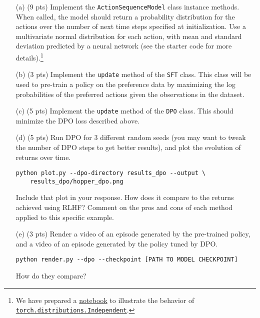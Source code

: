 \documentclass{article}
\begin{document}
\begin{enumerate}
    \item[(a) (9 pts)] Implement the \texttt{ActionSequenceModel} class instance methods. When called, the model should return a probability distribution for the actions over the number of next time steps specified at initialization. Use a multivariate normal distribution for each action, with mean and standard deviation predicted by a neural network (see the starter code for more details).\footnote{We have prepared a \href{https://colab.research.google.com/drive/1sw8FJIR5865laTJiI0fqHG3KcGVT23ED}{notebook} to illustrate the behavior of \href{https://pytorch.org/docs/stable/distributions.html\#independent}{\texttt{torch.distributions.Independent}}.}
    \item[(b) (3 pts)] Implement the \texttt{update} method of the \texttt{SFT} class. This class will be used to pre-train a policy on the preference data by maximizing the log probabilities of the preferred actions given the observations in the dataset.
    \item[(c) (5 pts)] Implement the \texttt{update} method of the \texttt{DPO} class. This should minimize the DPO loss described above.
    \item[(d) (5 pts)] Run DPO for 3 different random seeds (you may want to tweak the number of DPO steps to get better results), and plot the evolution of returns over time.

\begin{tcolorbox}
\begin{verbatim}
python plot.py --dpo-directory results_dpo --output \
    results_dpo/hopper_dpo.png
\end{verbatim}
\end{tcolorbox}
    
    Include that plot in your response. How does it compare to the returns achieved using RLHF? Comment on the pros and cons of each method applied to this specific example.
    \item[(e) (3 pts)] Render a video of an episode generated by the pre-trained policy, and a video of an episode generated by the policy tuned by DPO.

\begin{tcolorbox}
\begin{verbatim}
python render.py --dpo --checkpoint [PATH TO MODEL CHECKPOINT]
\end{verbatim}
\end{tcolorbox}

    How do they compare?
\end{enumerate}
\end{document}
